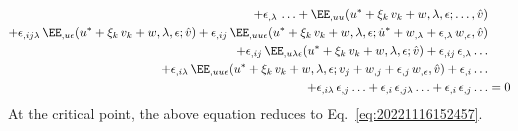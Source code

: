 \begin{equation}
\begin{aligned}[b]
    + \epsilon_{,\lambda} \, \ldots + \EE_{,uu}(u^\ast + \xi_k \, v_k + w, \lambda, \epsilon; \ldots, \hat{v}) &\\
    + \epsilon_{,ij\lambda} \, \EE_{,u\epsilon}(u^\ast + \xi_k \, v_k + w, \lambda, \epsilon; \hat{v}) + \epsilon_{,ij} \, \EE_{,uu\epsilon}(u^\ast + \xi_k \, v_k + w, \lambda, \epsilon; \dot{u}^\ast + w_{,\lambda} + \epsilon_{,\lambda} \, w_{,\epsilon}, \hat{v}) &\\
    + \epsilon_{,ij} \, \EE_{,u\lambda\epsilon}(u^\ast + \xi_k \, v_k + w, \lambda, \epsilon; \hat{v}) + \epsilon_{,ij} \, \epsilon_{,\lambda} \ldots &\\
    + \epsilon_{,i\lambda} \, \EE_{,uu\epsilon}(u^\ast + \xi_k \, v_k + w, \lambda, \epsilon; v_j + w_{,j} + \epsilon_{,j} \, w_{,\epsilon}, \hat{v}) + \epsilon_{,i} \ldots &\\
    + \epsilon_{,i\lambda} \, \epsilon_{,j} \ldots + \epsilon_{,i} \, \epsilon_{,j\lambda} \ldots + \epsilon_{,i} \, \epsilon_{,j} \ldots &= 0
  \end{aligned}
\end{equation}
At the critical point, the above equation reduces to Eq.~\eqref{eq:20221116152457}.

